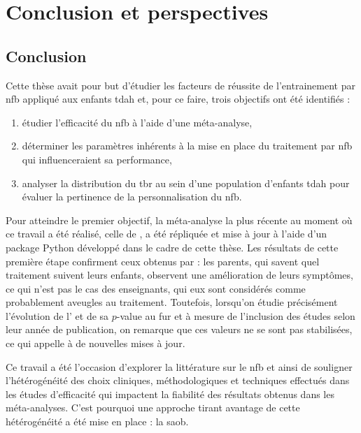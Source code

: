 \chapter{Conclusion et perspectives} \label{chapitre-5}

\section{Conclusion}

Cette thèse avait pour but d'étudier les facteurs de réussite de l'entrainement par \gls{nfb} appliqué aux enfants \gls{tdah} et, pour ce faire, trois objectifs ont été identifiés :
\begin{enumerate}
\item étudier l'efficacité du \gls{nfb} à l'aide d'une méta-analyse,
\item déterminer les paramètres inhérents à la mise en place du traitement par \gls{nfb} qui influenceraient sa performance,
\item analyser la distribution du \gls{tbr} au sein d'une population d'enfants \gls{tdah} pour évaluer la pertinence de la personnalisation du \gls{nfb}.
\end{enumerate}

Pour atteindre le premier objectif, la méta-analyse la plus récente au moment où ce travail a été réalisé, celle de \citep{Cortese2016}, a été répliquée et mise à jour à l'aide d'un package
Python développé dans le cadre de cette thèse. Les résultats de cette première étape confirment ceux obtenus par \citep{Cortese2016} : les parents, qui savent quel traitement suivent leurs enfants, 
observent une amélioration de leurs symptômes, ce qui n'est pas le cas des enseignants, qui eux sont considérés comme probablement aveugles au traitement. Toutefois, lorsqu'on étudie
précisément l'évolution de l' et de sa $p$-value au fur et à mesure de l'inclusion des études selon leur année de publication, on remarque que ces valeurs ne se sont pas 
stabilisées, ce qui appelle à de nouvelles mises à jour. 

Ce travail a été l'occasion d'explorer 
la littérature sur le \gls{nfb} et ainsi de souligner l'hétérogénéité des choix cliniques, méthodologiques et techniques effectués dans les études d'efficacité qui impactent la fiabilité
des résultats obtenus dans les méta-analyses. C'est pourquoi une approche tirant avantage de cette hétérogénéité a été mise en place : la \gls{saob}.

